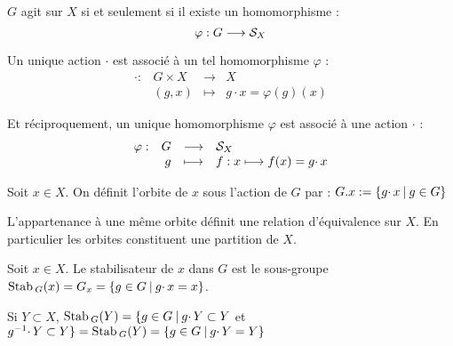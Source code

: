 \begin{prop}

$G$ agit sur $X$ si et seulement si il existe un homomorphisme :
\begin{displaymath}
 \varphi : G \longrightarrow \S_X
\end{displaymath}

Un unique action $\cdotp$ est associé à un tel homomorphisme $\varphi$ :
\begin{displaymath}
\begin{array}{rrcl}
          \cdotp :& G\times X& \longrightarrow & X \\
           & (g,x)    & \longmapsto     & g\cdotp x = \varphi(g)(x)
          \end{array}
\end{displaymath}

Et réciproquement, un unique homomorphisme $\varphi$ est associé à une action
$\cdotp$ :
\begin{displaymath}
\begin{array}{rrcl}
          \varphi :& G & \longrightarrow & \S_X \\
                   & g & \longmapsto     & f : x\longmapsto f(x) = g\cdotp x
          \end{array}
\end{displaymath}
\end{prop}

\begin{defi}[Orbite]

Soit $x\in X$. On définit l'orbite de $x$ sous l'action de $G$ par :
$G.x := \{g\cdotp x\tq g\in G\}$
\end{defi}

\begin{example}[Remarque]
 L'appartenance à une même orbite définit une relation d'équivalence sur $X$.
En particulier les orbites constituent une partition de $X$.
\end{example}

\begin{defi}[Stabilisateur]
 
Soit $x\in X$. Le stabilisateur de $x$ dans $G$ est le sous-groupe $\Stab_G(x)
= G_x = \{g\in G \tq g\cdotp x = x\}$.

Si $Y\subset X$, $\Stab_G(Y)= \{g\in G \tq g\cdotp Y \subset Y$ et
$g^{-1}\cdotp Y \subset Y \}
= \Stab_G(Y)= \{g\in G \tq g\cdotp Y = Y\}$
\end{defi}

